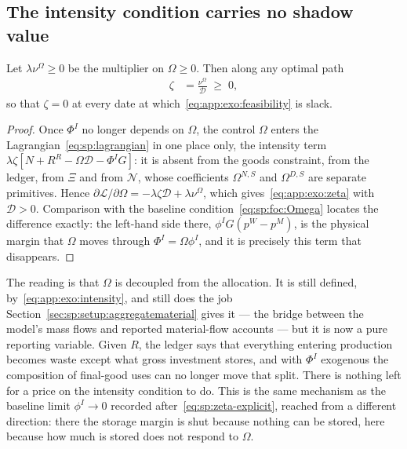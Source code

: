 \subsection{The intensity condition carries no shadow value}\label{sec:app:exo:zeta}

\begin{proposition}\label{prop:app:exo:zeta}
Let $\lambda\nu^\Omega\ge0$ be the multiplier on $\Omega\ge0$. Then along any optimal path
\begin{align}
\zeta &= \frac{\nu^\Omega}{\mathcal D}\;\ge\;0,
\label{eq:app:exo:zeta}
\end{align}
so that $\zeta=0$ at every date at which~\eqref{eq:app:exo:feasibility} is slack.
\end{proposition}

\begin{proof}
Once $\Phi^I$ no longer depends on $\Omega$, the control $\Omega$ enters the
Lagrangian~\eqref{eq:sp:lagrangian} in one place only, the intensity term
$\lambda\zeta\left[N+R^R-\Omega\mathcal D-\Phi^IG\right]$: it is absent from the goods constraint, from
the ledger, from $\Xi$ and from $\mathcal N$, whose coefficients $\Omega^{N,S}$ and $\Omega^{D,S}$ are
separate primitives. Hence $\partial\mathcal L/\partial\Omega=-\lambda\zeta\mathcal D+\lambda\nu^\Omega$,
which gives~\eqref{eq:app:exo:zeta} with $\mathcal D>0$. Comparison with the baseline
condition~\eqref{eq:sp:foc:Omega} locates the difference exactly: the left-hand side there,
$\phi^IG\left(p^W-p^M\right)$, is the physical margin that $\Omega$ moves through $\Phi^I=\Omega\phi^I$,
and it is precisely this term that disappears.
\end{proof}

The reading is that $\Omega$ is decoupled from the allocation. It is still defined,
by~\eqref{eq:app:exo:intensity}, and still does the job Section~\ref{sec:sp:setup:aggregatematerial}
gives it --- the bridge between the model's mass flows and reported material-flow accounts --- but it
is now a pure reporting variable. Given $R$, the ledger says that everything entering production
becomes waste except what gross investment stores, and with $\Phi^I$ exogenous the composition of
final-good uses can no longer move that split. There is nothing left for a price on the intensity
condition to do. This is the same mechanism as the baseline limit $\phi^I\to0$ recorded
after~\eqref{eq:sp:zeta-explicit}, reached from a different direction: there the storage margin is shut
because nothing can be stored, here because how much is stored does not respond to $\Omega$.

